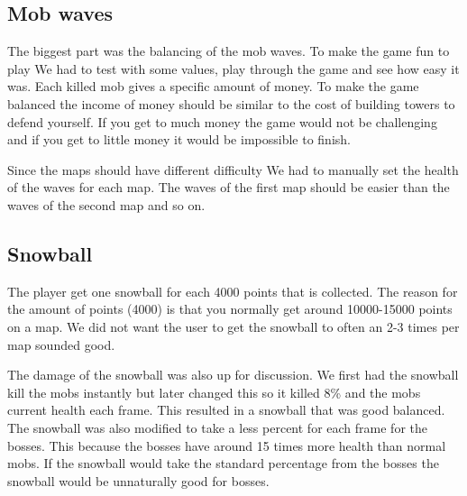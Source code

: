 \subsection{Mob waves}

The biggest part was the balancing of the mob waves. To make the game fun to play We had to test with some values, play through the game and see how easy it was. Each killed mob gives a specific amount of money. To make the game balanced the income of money should be similar to the cost of building towers to defend yourself. If you get to much money the game would not be challenging and if you get to little money it would be impossible to finish.

Since the maps should have different difficulty We had to manually set the health of the waves for each map. The waves of the first map should be easier than the waves of the second map and so on. 
\subsection{Snowball}

The player get one snowball for each 4000 points that is collected. The reason for the amount of points (4000) is that you normally get around 10000-15000 points on a map. We did not want the user to get the snowball to often an 2-3 times per map sounded good.


The damage of the snowball was also up for discussion. We first had the snowball kill the mobs instantly but later changed this so it killed 8\% and the mobs current health each frame. This resulted in a snowball that was good balanced. The snowball was also modified to take a less percent for each frame for the bosses. This because the bosses have around 15 times more health than normal mobs. If the snowball would take the standard percentage from the bosses the snowball would be unnaturally good for bosses.
